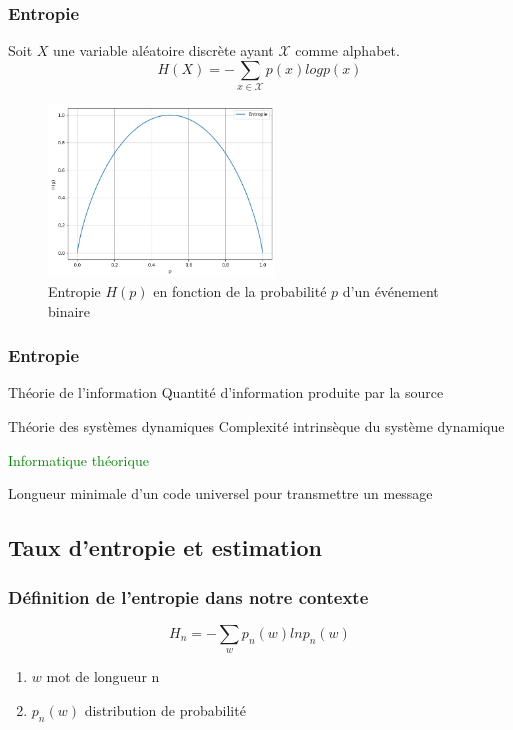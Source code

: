 \documentclass{beamer}
\begin{document}
\begin{frame}
\frametitle{Entropie}
Soit $X$ une variable aléatoire discrète ayant $\mathcal{X}$ comme alphabet.
\begin{equation}
    H(X) = - \sum_{x \in \mathcal{X}} p(x)logp(x)
\end{equation}
\begin{figure}[!ht]
    \centering
    \includegraphics[width=6cm]{exemple_entropie.png}
    \caption{Entropie $H(p)$ en fonction de la probabilité $p$ d'un événement binaire}
    \label{fig4.5}
\end{figure}
\end{frame}

\begin{frame}
\frametitle{Entropie}
\begin{block}{Théorie de l'information}
Quantité d'information produite par la source
\end{block}

\begin{alertblock}{Théorie des systèmes dynamiques}
Complexité intrinsèque du système dynamique
\end{alertblock}

\vspace{2ex}
\textcolor{green}{Informatique théorique}

\vspace{2ex}
Longueur minimale d'un code universel pour transmettre un message
\end{frame}

\subsection{Taux d'entropie et estimation}

\begin{frame}
\frametitle{Définition de l'entropie dans notre contexte}
\begin{equation}
    H_n = - \sum_{w}p_n(w)lnp_n(w)
\end{equation}

\begin{enumerate}
	\item $w$ mot de longueur n
	\item $p_n(w)$ distribution de probabilité
\end{enumerate}
\end{frame}
\end{document}
